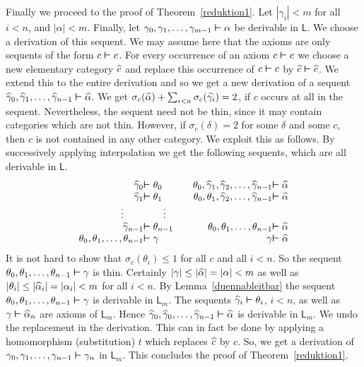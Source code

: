 \noindent
Finally we proceed to the proof of Theorem~\ref{reduktion1}. Let
$|\gamma_i| < m$ for all $i < n$, and $|\alpha| < m$. Finally, let
$\gamma_0, \gamma_1, \dotsc, \gamma_{m-1} \boldsymbol{\vdash} \alpha$ be
derivable in $\mathsf{L}$. We choose a derivation of this sequent.
We may assume here that the axioms are only sequents of the
form $c \boldsymbol{\vdash} c$. For every occurrence of an axiom $c \boldsymbol{\vdash} c$
we choose a new elementary category $\widehat{c}$ and replace this
occurrence of $c \boldsymbol{\vdash} c$ by $\widehat{c} \boldsymbol{\vdash} \widehat{c}$. We extend
this to the entire derivation and so we get a new derivation
of a sequent $\widehat{\gamma}_0, \widehat{\gamma}_1,
\dotsc, \widehat{\gamma}_{n-1} \boldsymbol{\vdash} \widehat{\alpha}$. We get
$\sigma_c(\widehat{\alpha}) + \sum_{i < n} \sigma_c(\widehat{\gamma_i}) = 2$,
if $c$ occurs at all in the sequent. Nevertheless, the sequent
need not be thin, since it may contain categories which are not
thin. However, if $\sigma_c(\delta) = 2$ for some $\delta$ and
some $c$, then $c$ is not contained in any other category.
We exploit this as follows. By successively applying interpolation
we get the following sequents, which are all derivable in $\mathsf{L}$.
\begin{equation}
\begin{array}{r@{}l@{\qquad}r@{}l}
\wht{\gamma}_0 & \bvdash \theta_0 & \theta_0, \wht{\gamma}_1,
    \wht{\gamma}_2, \dotsc, \wht{\gamma}_{n-1}
    & \bvdash \wht{\alpha} \\
\wht{\gamma}_1 & \bvdash \theta_1 & \theta_0, \theta_1,
    \wht{\gamma}_2, \dotsc, \wht{\gamma}_{n-1}
    & \bvdash \wht{\alpha} \\
\vdots\qquad & \qquad \vdots \\
\wht{\gamma}_{n-1} & \bvdash \theta_{n-1} & \theta_0, \theta_1,
    \dotsc, \theta_{n-1} & \bvdash \wht{\alpha} \\
\theta_0, \theta_1, \dotsc, \theta_{n-1} & \bvdash \gamma &
        \gamma & \bvdash \wht{\alpha}
\end{array}
\end{equation}
It is not hard to show that $\sigma_c(\theta_i) \leq 1$
for all $c$ and all $i < n$. So the sequent
$\theta_0, \theta_1, \dotsc, \theta_{n-1} \boldsymbol{\vdash} \gamma$
is thin. Certainly $|\gamma| \leq |\widehat{\alpha}| = |\alpha| < m$
as well as $|\theta_i| \leq |\widehat{\alpha}_i| = |\alpha_i| < m$
for all $i < n$. By Lemma~\ref{duennableitbar} the sequent
$\theta_0, \theta_1, \dotsc, \theta_{n-1} \boldsymbol{\vdash} \gamma$ is
derivable in $\mathsf{L}_m$. The sequents $\wht{\gamma}_i \bvdash %
\theta_i$, $i < n$, as well as $\gamma \boldsymbol{\vdash} \widehat{\alpha}_n$ are 
axioms of $\mathsf{L}_m$. Hence $\widehat{\gamma}_0, \widehat{\gamma}_0, \dotsc,
\widehat{\gamma}_{n-1} \boldsymbol{\vdash} \widehat{\alpha}$ is derivable in $\mathsf{L}_m$.
We undo the replacement in the derivation. This can in fact
be done by applying a homomorphism (substitution) $t$ which
replaces $\widehat{c}$ by $c$. So, we get a derivation of
$\gamma_0, \gamma_1, \dotsc, \gamma_{n-1} \boldsymbol{\vdash} \gamma_n$ in
$\mathsf{L}_m$. This concludes the proof of Theorem~\ref{reduktion1}.

